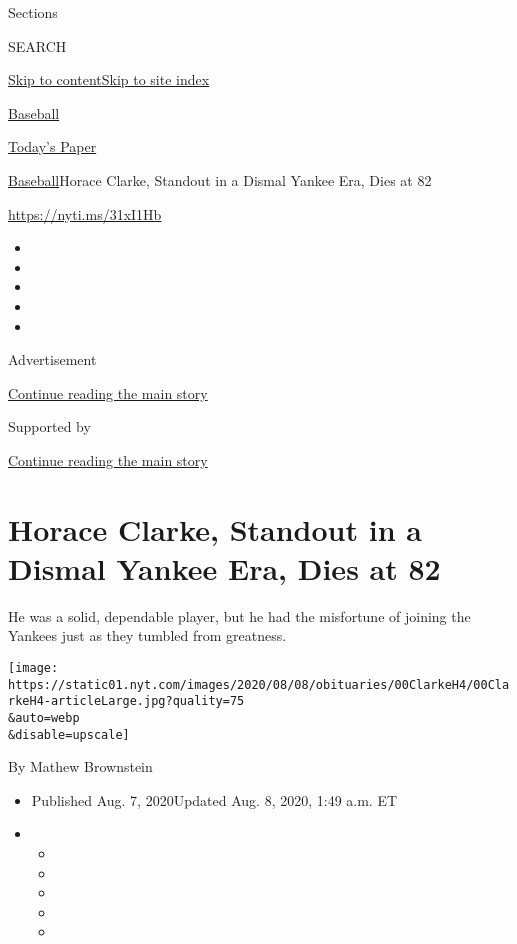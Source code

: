 Sections

SEARCH

\protect\hyperlink{site-content}{Skip to
content}\protect\hyperlink{site-index}{Skip to site index}

\href{https://www.nytimes.com/section/sports/baseball}{Baseball}

\href{https://myaccount.nytimes.com/auth/login?response_type=cookie\&client_id=vi}{}

\href{https://www.nytimes.com/section/todayspaper}{Today's Paper}

\href{/section/sports/baseball}{Baseball}\textbar{}Horace Clarke,
Standout in a Dismal Yankee Era, Dies at 82

\href{https://nyti.ms/31xI1Hb}{https://nyti.ms/31xI1Hb}

\begin{itemize}
\item
\item
\item
\item
\item
\end{itemize}

Advertisement

\protect\hyperlink{after-top}{Continue reading the main story}

Supported by

\protect\hyperlink{after-sponsor}{Continue reading the main story}

\hypertarget{horace-clarke-standout-in-a-dismal-yankee-era-dies-at-82}{%
\section{Horace Clarke, Standout in a Dismal Yankee Era, Dies at
82}\label{horace-clarke-standout-in-a-dismal-yankee-era-dies-at-82}}

He was a solid, dependable player, but he had the misfortune of joining
the Yankees just as they tumbled from greatness.

\texttt{[image: https://static01.nyt.com/images/2020/08/08/obituaries/00ClarkeH4/00ClarkeH4-articleLarge.jpg?quality=75\\\&auto=webp\\\&disable=upscale]}

By Mathew Brownstein

\begin{itemize}
\item
  Published Aug. 7, 2020Updated Aug. 8, 2020, 1:49 a.m. ET
\item
  \begin{itemize}
  \item
  \item
  \item
  \item
  \item
  \end{itemize}
\end{itemize}

